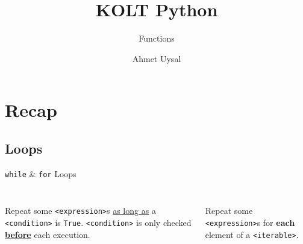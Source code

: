 
\usepackage{../KU-Beamer-Template/style/koc} 
\usepackage{minted}
\usepackage{upquote}
\usepackage{graphicx}


\title{KOLT Python}
\subtitle{Functions} 
\date{}
\author{Ahmet Uysal}


\makeatletter
\let\@@magyar@captionfix\relax
\makeatother

    \maketitle

    
    \section{Recap}

    \subsection{Loops}

    \begin{frame}{\texttt{while} \& \texttt{for} Loops}
        \begin{columns}
            \begin{column}{0.45\textwidth}
                \inputminted[frame=single,framesep=2pt]{python3}{../Lecture3/code-examples/while1.py}
                \pause
                Repeat some \texttt{<expression>}s \underline{as long as} a \texttt{<condition>} is \texttt{True}.
                \pause
                \medskip
                \texttt{<condition>} is only checked \textbf{\underline{before}} each execution.
            \end{column}
            \pause
            \begin{column}{0.45\textwidth}
                \inputminted[frame=single,framesep=2pt]{python3}{../Lecture3/code-examples/for1.py}
                \pause
                Repeat some \texttt{<expression>}s for \textbf{each} element of a \texttt{<iterable>}.
            \end{column} 
        \end{columns}
    \end{frame}

